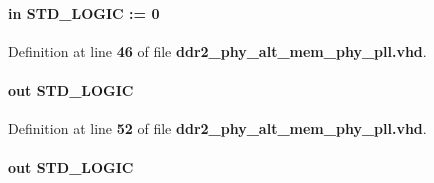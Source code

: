 \paragraph[{areset}]{ {\bfseries \textcolor{keywordflow}{in}\textcolor{vhdlchar}{ }} {\bfseries \textcolor{comment}{S\+T\+D\+\_\+\+L\+O\+G\+IC}\textcolor{vhdlchar}{ }\textcolor{vhdlchar}{ }\textcolor{vhdlchar}{\+:}\textcolor{vhdlchar}{=}\textcolor{vhdlchar}{ }\textcolor{vhdlchar}{ }\textcolor{vhdlchar}{\textquotesingle{}}\textcolor{vhdlchar}{ } \textcolor{vhdldigit}{0} \textcolor{vhdlchar}{ }\textcolor{vhdlchar}{\textquotesingle{}}\textcolor{vhdlchar}{ }} \hspace{0.3cm}{\ttfamily [Port]}}\label{classddr2__phy__alt__mem__phy__pll_a5ff6e3af321d94570fc485fa1bce5a06}


Definition at line {\bf 46} of file {\bf ddr2\+\_\+phy\+\_\+alt\+\_\+mem\+\_\+phy\+\_\+pll.\+vhd}.

\paragraph[{c0}]{ {\bfseries \textcolor{keywordflow}{out}\textcolor{vhdlchar}{ }} {\bfseries \textcolor{comment}{S\+T\+D\+\_\+\+L\+O\+G\+IC}\textcolor{vhdlchar}{ }} \hspace{0.3cm}{\ttfamily [Port]}}\label{classddr2__phy__alt__mem__phy__pll_abbf54d96b104435e8cbaadcf0e9184bd}


Definition at line {\bf 52} of file {\bf ddr2\+\_\+phy\+\_\+alt\+\_\+mem\+\_\+phy\+\_\+pll.\+vhd}.

\paragraph[{c1}]{ {\bfseries \textcolor{keywordflow}{out}\textcolor{vhdlchar}{ }} {\bfseries \textcolor{comment}{S\+T\+D\+\_\+\+L\+O\+G\+IC}\textcolor{vhdlchar}{ }} \hspace{0.3cm}{\ttfamily [Port]}}\label{classddr2__phy__alt__mem__phy__pll_ad09a0b4dbaee62095a99573007c9a58e}



